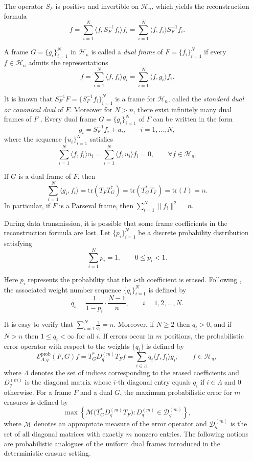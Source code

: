 \documentclass[final,1p,times]{elsarticle}
\begin{document}
The operator $S_F$ is positive and invertible on $\mathcal{H}_n$, which yields the reconstruction formula
\[
f=\sum_{i=1}^N \langle f,S_F^{-1}f_i\rangle f_i = \sum_{i=1}^N \langle f,f_i\rangle S_F^{-1}f_i.
\]

A frame $G=\{g_i\}_{i=1}^N$ in $\mathcal{H}_n$ is called a \textit{dual frame} of $F=\{f_i\}_{i=1}^N$ if every $f\in \mathcal{H}_n$ admits the representations
\[
f = \sum_{i=1}^N \langle f,f_i\rangle g_i
  = \sum_{i=1}^N \langle f,g_i\rangle f_i .
\]

It is known that $S_F^{-1}F=\{S_F^{-1}f_i\}_{i=1}^N$ is a frame for $\mathcal{H}_n$, called the \textit{ standard dual or canonical dual } of $F$. Moreover for $N>n$, there exist infinitely many dual frames of $F$ \cite{ole}. Every dual frame 
$G=\{g_i\}_{i=1}^N$ of $F$ can be written in the form
\[
g_i = S_F^{-1}f_i + u_i , \qquad i=1,\dots,N,
\]
where the sequence $\{u_i\}_{i=1}^N$ satisfies
\[
\sum_{i=1}^N \langle f,f_i\rangle u_i = 
\sum_{i=1}^N \langle f,u_i\rangle f_i =0,
\qquad \forall f\in \mathcal{H}_n .
\]

If $G$ is a dual frame of $F$, then
\[
\sum_{i=1}^N \langle g_i,f_i\rangle
= \mathrm{tr}(T_F T_G^*)
= \mathrm{tr}(T_G^* T_F)
= \mathrm{tr}(I)
= n .
\]
In particular, if $F$ is a Parseval frame, then $\sum_{i=1}^N \|f_i\|^2 = n .$

\medskip

During data transmission, it is possible that some frame coefficients in the reconstruction formula are lost. 
Let $\{p_i\}_{i=1}^N$ be a discrete probability distribution satisfying
\[
\sum_{i=1}^N p_i = 1, \qquad 0 \le p_i <1 .
\]

Here $p_i$ represents the probability that the $i$-th coefficient is erased. 
Following \cite{leng}, the associated weight number sequence $\{q_i\}_{i=1}^N$ is defined by
\[
q_i = \frac{1}{1-p_i}\cdot \frac{N-1}{n}, 
\qquad i=1,2,\dots,N .
\]

It is easy to verify that $\sum_{i=1}^N \frac{1}{q_i} = n .$ Moreover, if $N\ge2$ then $q_i>0$, and if $N>n$ then $1\le q_i<\infty$ for all $i$. If errors occur in $m$ positions, the probabilistic error operator with respect to the weights $\{q_i\}$ is defined by
\[
\mathcal{E}_{\Lambda,q}^{\text{prob}}(F,G)f
= T_G^* D^{(m)}_q T_F f
= \sum_{i\in\Lambda} q_i \langle f,f_i\rangle g_i ,
\qquad f\in \mathcal{H}_n ,
\]
where $\Lambda$ denotes the set of indices corresponding to the erased coefficients and $D^{(m)}_q$ is the diagonal matrix whose $i$-th diagonal entry equals $q_i$ if $i\in\Lambda$ and $0$ otherwise. For a frame $F$ and a dual $G$, the maximum probabilistic error for $m$ erasures is defined by
\[
\max \left\{ 
\mathcal{M}\big(T_G^* D_q^{(m)} T_F \big) :
D_q^{(m)} \in \mathcal{D}_q^{(m)}
\right\},
\]
where $\mathcal{M}$ denotes an appropriate measure of the error operator and $\mathcal{D}_q^{(m)}$ is the set of all diagonal matrices with exactly $m$ nonzero entries. The following notions are probabilistic analogues of the uniform dual frames introduced in the deterministic erasure setting.
\end{document}
